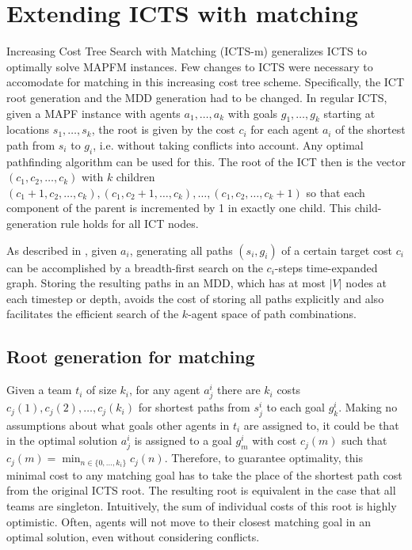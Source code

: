 \documentclass[english]{article}
\begin{document}
	\section{Extending ICTS with matching} %
	Increasing Cost Tree Search with Matching (ICTS-m) generalizes ICTS to optimally solve MAPFM instances. Few changes to ICTS were necessary to accomodate for matching in this increasing cost tree scheme. Specifically, the ICT root generation and the MDD generation had to be changed. In regular ICTS, given a MAPF instance with agents $a_1,\ldots,a_k$ with goals $g_1,\ldots,g_k$ starting at locations $s_1,\ldots,s_k$, the root is given by the cost $c_i$ for each agent $a_i$ of the shortest path from $s_i$ to $g_i$, i.e. without taking conflicts into account. Any optimal pathfinding algorithm can be used for this. The root of the ICT then is the vector $(c_1,c_2,\ldots,c_k)$ with $k$ children $(c_1 + 1, c_2,\ldots,c_k), (c_1, c_2 + 1,\ldots,c_k),\ldots,(c_1, c_2,\ldots,c_k + 1)$ so that each component of the parent is incremented by 1 in exactly one child. This child-generation rule holds for all ICT nodes. 
	
	As described in \cite{sharon2011}, given $a_i$, generating all paths $(s_i,g_i)$ of a certain target cost $c_i$ can be accomplished by a breadth-first search on the $c_i$-steps time-expanded graph. Storing the resulting paths in an MDD, which has at most $|V|$ nodes at each timestep or depth, avoids the cost of storing all paths explicitly and also facilitates the efficient search of the $k$-agent space of path combinations.
	\subsection{Root generation for matching}
	Given a team $t_i$ of size $k_i$, for any agent $a_j^i$ there are $k_i$ costs $c_j(1),c_j(2),\ldots,c_j(k_i)$ for shortest paths from $s_j^i$ to each goal $g_k^i$. Making no assumptions about what goals other agents in $t_i$ are assigned to, it could be that in the optimal solution $a_j^i$ is assigned to a goal $g_{m}^i$ with cost $c_j(m)$ such that $c_j(m) = \min_{n\in\{0,\ldots,k_i\}} c_j(n)$. Therefore, to guarantee optimality, this minimal cost to any matching goal has to take the place of the shortest path cost from the original ICTS root. The resulting root is equivalent in the case that all teams are singleton. Intuitively, the sum of individual costs of this root is highly optimistic. Often, agents will not move to their closest matching goal in an optimal solution, even without considering conflicts.
	
\end{document}
